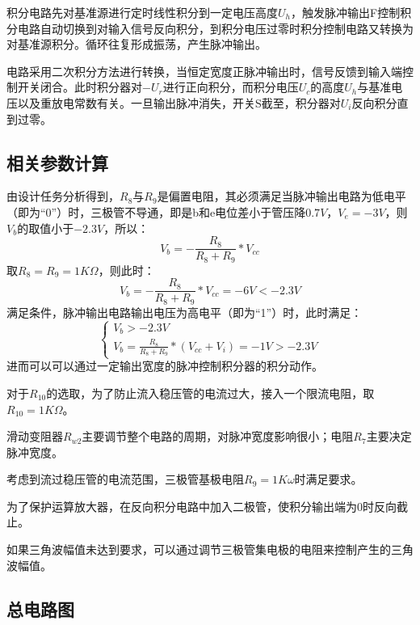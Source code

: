 \documentclass[12pt]{article}
\begin{document}
积分电路先对基准源进行定时线性积分到一定电压高度$U_h$，触发脉冲输出F控制积分电路自动切换到对输入信号反向积分，到积分电压过零时积分控制电路又转换为对基准源积分。循环往复形成振荡，产生脉冲输出。

电路采用二次积分方法进行转换，当恒定宽度正脉冲输出时，信号反馈到输入端控制开关闭合。此时积分器对$-U_r$进行正向积分，而积分电压$U_c$的高度$U_h$与基准电压以及重放电常数有关。一旦输出脉冲消失，开关S截至，积分器对$U_i$反向积分直到过零。

\subsection{相关参数计算}

由设计任务分析得到，$R_8$与$R_9$是偏置电阻，其必须满足当脉冲输出电路为低电平（即为“0”）时，三极管不导通，即是b和e电位差小于管压降$0.7V$，$V_e=-3V$，则$V_b$的取值小于$-2.3V$，所以：
\begin{equation}
V_b = -  \frac{R_8}{R_8+R_9} * V_{cc}
\end{equation}
取$R_8 = R_9 = 1K\Omega$，则此时：
\begin{equation}
V_b = -  \frac{R_8}{R_8+R_9} * V_{cc} = -6V < -2.3V
\end{equation}
满足条件，脉冲输出电路输出电压为高电平（即为“1”）时，此时满足：
\begin{equation*}
    \begin{cases}
        V_b>-2.3V \\
        V_b = \frac{R_8}{R_8+R_9} * (V_{cc} + V_i) = -1V > -2.3V
    \end{cases}
\end{equation*}
进而可以可以通过一定输出宽度的脉冲控制积分器的积分动作。

对于$R_{10}$的选取，为了防止流入稳压管的电流过大，接入一个限流电阻，取$R_{10}=1K\Omega$。

滑动变阻器$R_{w2}$主要调节整个电路的周期，对脉冲宽度影响很小；电阻$R_7$主要决定脉冲宽度。

考虑到流过稳压管的电流范围，三极管基极电阻$R_9=1 K\omega$时满足要求。

为了保护运算放大器，在反向积分电路中加入二极管，使积分输出端为0时反向截止。

如果三角波幅值未达到要求，可以通过调节三极管集电极的电阻来控制产生的三角波幅值。

\subsection{总电路图}
\end{document}
